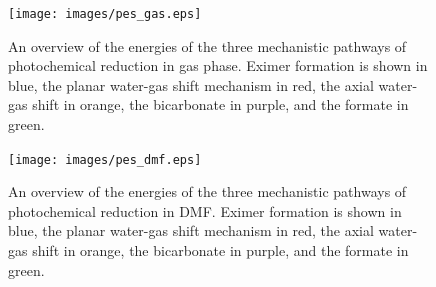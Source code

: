 \begin{landscape}
\begin{figure}[!htbp]
\end{figure} 
\begin{figure}[!htbp]
 \begin{center}
  \texttt{[image: images/pes\_gas.eps]}
 \end{center}
\caption[An overview of the energies of the three mechanistic pathways of photochemical  reduction in gas phase.]{An overview of the energies of the three mechanistic pathways of photochemical  reduction in gas phase. Eximer formation is shown in blue, the planar water-gas shift mechanism in red, the axial water-gas shift in orange, the bicarbonate in purple, and the formate in green.}
\label{fig.pes_gas}
\end{figure} 

\begin{figure}[!htbp]
 \begin{center}
  \texttt{[image: images/pes\_dmf.eps]}
 \end{center}
\caption[An overview of the energies of the three mechanistic pathways of photochemical  reduction in DMF.]{An overview of the energies of the three mechanistic pathways of photochemical  reduction in DMF. Eximer formation is shown in blue, the planar water-gas shift mechanism in red, the axial water-gas shift in orange, the bicarbonate in purple, and the formate in green.}
\label{fig.pes_dmf}
\end{figure} 

\end{landscape}